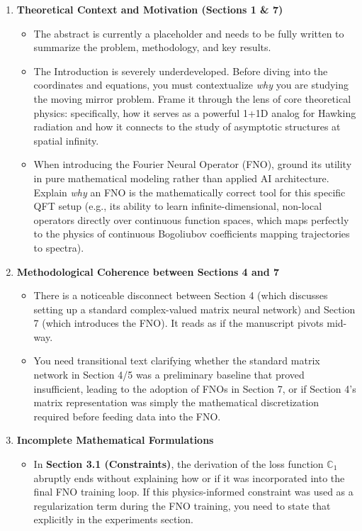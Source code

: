 \begin{enumerate}
    \item \textbf{Theoretical Context and Motivation (Sections 1 \& 7)}
    \begin{itemize}
        \item The abstract is currently a placeholder and needs to be fully written to summarize the problem, methodology, and key results.
        \item The Introduction is severely underdeveloped. Before diving into the coordinates and equations, you must contextualize \textit{why} you are studying the moving mirror problem. Frame it through the lens of core theoretical physics: specifically, how it serves as a powerful 1+1D analog for Hawking radiation and how it connects to the study of asymptotic structures at spatial infinity. 
        \item When introducing the Fourier Neural Operator (FNO), ground its utility in pure mathematical modeling rather than applied AI architecture. Explain \textit{why} an FNO is the mathematically correct tool for this specific QFT setup (e.g., its ability to learn infinite-dimensional, non-local operators directly over continuous function spaces, which maps perfectly to the physics of continuous Bogoliubov coefficients mapping trajectories to spectra).
    \end{itemize}

    \item \textbf{Methodological Coherence between Sections 4 and 7}
    \begin{itemize}
        \item There is a noticeable disconnect between Section 4 (which discusses setting up a standard complex-valued matrix neural network) and Section 7 (which introduces the FNO). It reads as if the manuscript pivots mid-way. 
        \item You need transitional text clarifying whether the standard matrix network in Section 4/5 was a preliminary baseline that proved insufficient, leading to the adoption of FNOs in Section 7, or if Section 4's matrix representation was simply the mathematical discretization required before feeding data into the FNO.
    \end{itemize}

    \item \textbf{Incomplete Mathematical Formulations}
    \begin{itemize}
        \item In \textbf{Section 3.1 (Constraints)}, the derivation of the loss function $\mathbb{C}_1$ abruptly ends without explaining how or if it was incorporated into the final FNO training loop. If this physics-informed constraint was used as a regularization term during the FNO training, you need to state that explicitly in the experiments section.
    \end{itemize}


\end{enumerate}
